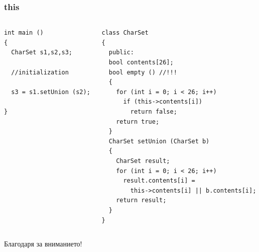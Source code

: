 \documentclass{beamer}
\begin{document}
\begin{frame}[fragile]
\frametitle{this}


\begin{columns}[t]
  \begin{column}{0.5\textwidth}
\begin{flushleft}
\begin{lstlisting}
int main ()
{
  CharSet s1,s2,s3;

  //initialization

  s3 = s1.setUnion (s2);

}
\end{lstlisting}  
\end{flushleft}
  \end{column}
  \begin{column}{0.5\textwidth}
\begin{flushleft}
\begin{lstlisting}
class CharSet
{
  public:
  bool contents[26];
  bool empty () //!!!
  {
    for (int i = 0; i < 26; i++)
      if (this->contents[i])
        return false;
    return true;
  }
  CharSet setUnion (CharSet b)
  {
    CharSet result;
    for (int i = 0; i < 26; i++)
      result.contents[i] = 
        this->contents[i] || b.contents[i];
    return result;
  }
}
\end{lstlisting}  
\end{flushleft}

  \end{column}
\end{columns}


\end{frame}


\begin{frame}
\centerline{Благодаря за вниманието!}
\end{frame}
\end{document}
